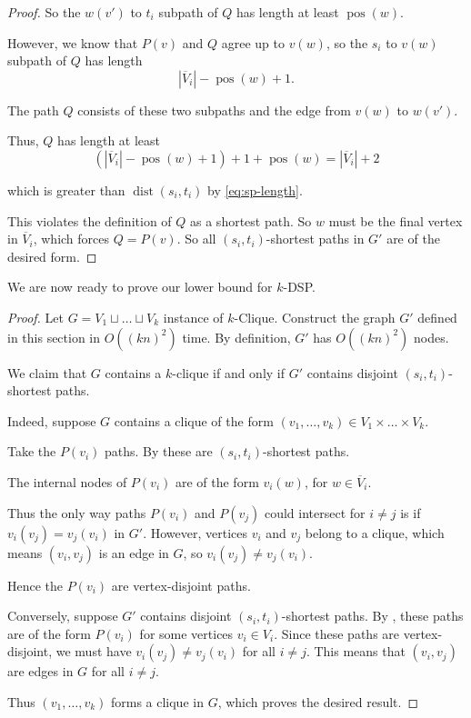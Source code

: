 \documentclass[11pt]{article}
\newcommand{\grp}[1]{\left(#1\right)}
\DeclareMathOperator{\dist}{dist}
\renewcommand{\bar}{\overline}
\DeclareMathOperator{\pos}{pos}
\theoremstyle{definition}
\newtheorem{lemma}[theorem]{Lemma}
\begin{document}
\begin{proof}
So the $w(v')$ to $t_i$ subpath of $Q$ has length at least $\pos(w)$.

However, we know that $P(v)$ and $Q$ agree up to $v(w)$, so the $s_i$ to $v(w)$ subpath of $Q$ has length 
    \[|\bar{V}_i| - \pos(w) + 1.\]
    
The path $Q$ consists of these two subpaths and the edge from $v(w)$ to $w(v')$.

Thus, $Q$ has length at least 
\[\grp{|\bar{V}_i| - \pos(w) + 1} + 1 + \pos(w) = |\bar{V}_i| + 2\]

which is greater than $\dist(s_i,t_i)$ by \cref{eq:sp-length}.

This violates the definition of $Q$ as a shortest path.
So $w$ must be the final vertex in $\bar{V}_i$, which forces $Q = P(v)$.
So all $(s_i,t_i)$-shortest paths in $G'$ are of the desired form.
\end{proof}


We are now ready to prove our lower bound for \textsf{$k$-DSP}.


\lbdspboth*
\begin{proof}
    Let $G = V_1\sqcup\dots\sqcup V_k$ instance of \textsf{$k$-Clique}.
    Construct the graph $G'$ defined in this section in $O((kn)^2)$ time.
    By definition, $G'$ has $O((kn)^2)$ nodes.
    
    We claim that $G$ contains a $k$-clique if and only if $G'$ contains disjoint $(s_i,t_i)$-shortest paths.

    Indeed, suppose $G$ contains a clique of the form $(v_1, \dots, v_k)\in V_1\times\dots\times V_k$.
    
    Take the $P(v_i)$ paths.
    By  these are $(s_i,t_i)$-shortest paths.
    
    The internal nodes of $P(v_i)$ are of the form $v_i(w)$, for $w\in \bar{V}_i$.
    
    Thus the only way paths $P(v_i)$ and $P(v_j)$ could intersect for $i\neq j$ is if $v_i(v_j) = v_j(v_i)$ in $G'$.
    However, vertices $v_i$ and $v_j$ belong to a clique, which means $(v_i,v_j)$ is an edge in $G$, so $v_i(v_j)\neq v_j(v_i)$.

    Hence the $P(v_i)$ are vertex-disjoint paths.

    Conversely, suppose $G'$ contains disjoint $(s_i,t_i)$-shortest paths.
    By , these paths are of the form $P(v_i)$ for some vertices $v_i\in V_i$.
    Since these paths are vertex-disjoint, we must have $v_i(v_j)\neq v_j(v_i)$ for all $i\neq j$.
    This means that $(v_i,v_j)$ are edges in $G$ for all $i\neq j$.
    
    Thus $(v_1,\dots, v_k)$ forms a clique in $G$, which proves the desired result.    
\end{proof}
\end{document}
